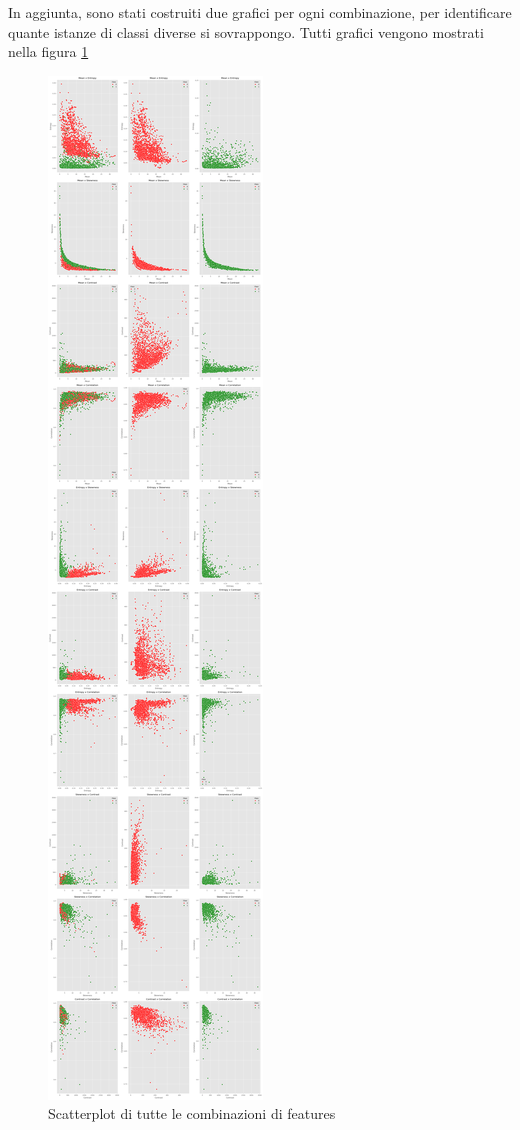 In aggiunta, sono stati costruiti due grafici per ogni combinazione, per identificare
quante istanze di classi diverse si sovrappongo. Tutti grafici vengono mostrati nella figura
\ref{fig:scatterplot_features}

\newpage

\begin{figure}[!h]
      \centering
      \includegraphics[height=\textheight]{img/analisi/scatterplot.png}
      \caption{Scatterplot di tutte le combinazioni di features}
      \label{fig:scatterplot_features}
\end{figure}

